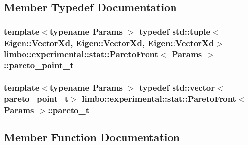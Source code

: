 \subsection{Member Typedef Documentation}
\hypertarget{structlimbo_1_1experimental_1_1stat_1_1_pareto_front_a07a9d1b38b8c942ec0666841ec310ed8}{}
\subsubsection[{pareto\+\_\+point\+\_\+t}]{\setlength{\rightskip}{0pt plus 5cm}template$<$typename Params $>$ typedef std\+::tuple$<$Eigen\+::\+Vector\+Xd, Eigen\+::\+Vector\+Xd, Eigen\+::\+Vector\+Xd$>$ {\bf limbo\+::experimental\+::stat\+::\+Pareto\+Front}$<$ Params $>$\+::{\bf pareto\+\_\+point\+\_\+t}}\label{structlimbo_1_1experimental_1_1stat_1_1_pareto_front_a07a9d1b38b8c942ec0666841ec310ed8}
\hypertarget{structlimbo_1_1experimental_1_1stat_1_1_pareto_front_ad43dd449215fa8e506851c3f7fc96940}{}
\subsubsection[{pareto\+\_\+t}]{\setlength{\rightskip}{0pt plus 5cm}template$<$typename Params $>$ typedef std\+::vector$<${\bf pareto\+\_\+point\+\_\+t}$>$ {\bf limbo\+::experimental\+::stat\+::\+Pareto\+Front}$<$ Params $>$\+::{\bf pareto\+\_\+t}}\label{structlimbo_1_1experimental_1_1stat_1_1_pareto_front_ad43dd449215fa8e506851c3f7fc96940}


\subsection{Member Function Documentation}
\hypertarget{structlimbo_1_1experimental_1_1stat_1_1_pareto_front_aa9576e145574a7c7dede0d7497388fec}{}
